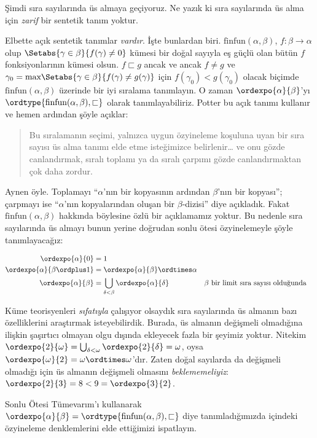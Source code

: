 


Şimdi sıra sayılarında üs almaya geçiyoruz. Ne yazık ki sıra sayılarında üs
alma için \emph{zarif} bir sentetik tanım yoktur.

Elbette açık sentetik tanımlar \emph{vardır}. İşte bunlardan biri.
$\text{finfun}(\alpha,\beta)$, $f\colon\beta\to\alpha$ olup
$\Setabs{\gamma\in\beta}{f(\gamma)\neq 0}$ kümesi bir doğal sayıyla eş
güçlü olan bütün $f$ fonksiyonlarının kümesi olsun. $f\sqsubset g$ ancak ve
ancak $f\neq g$ ve
$\gamma_0=\text{max}\Setabs{\gamma\in\beta}{f(\gamma)\neq g(\gamma)}$
için $f(\gamma_0)<g(\gamma_0)$ olacak biçimde
$\text{finfun}(\alpha,\beta)$ üzerinde bir iyi sıralama tanımlayın. O zaman
$\ordexpo{\alpha}{\beta}$'yı
$\ordtype{\text{finfun}(\alpha,\beta),\sqsubset}$ olarak tanımlayabiliriz.
Potter bu açık tanımı kullanır ve hemen ardından şöyle açıklar:
\begin{quote}
	Bu sıralamanın seçimi, yalnızca uygun özyineleme koşuluna uyan bir sıra
	sayısı üs alma tanımı elde etme isteğimizce belirlenir\ldots{} ve onu
	gözde canlandırmak, sıralı toplamı ya da sıralı çarpımı
	gözde canlandırmaktan çok daha zordur.
	\citep[p.~199]{Potter2004}
\end{quote}
Aynen öyle. Toplamayı ``$\alpha$'nın bir kopyasının ardından $\beta$'nın
bir kopyası''; çarpmayı ise ``$\alpha$'nın kopyalarından oluşan bir
$\beta$-dizisi'' diye açıkladık. Fakat
$\text{finfun}(\alpha,\beta)$ hakkında böylesine özlü bir açıklamamız
yoktur. Bu nedenle sıra sayılarında üs almayı bunun yerine doğrudan
sonlu ötesi özyinelemeyle şöyle tanımlayacağız:

\begin{defn}
\begin{align*}
	\ordexpo{\alpha}{0} &= 1\\
	\ordexpo{\alpha}{\beta\ordplus 1} &=\ordexpo{\alpha}{\beta} \ordtimes \alpha\\
	\ordexpo{\alpha}{\beta} &= \bigcup_{\delta < \beta}\ordexpo{\alpha}{\delta}& & \text{$\beta$ bir limit sıra sayısı olduğunda}
\end{align*}
\end{defn}

Küme teorisyenleri \emph{sıfatıyla} çalışıyor olsaydık sıra sayılarında üs
almanın bazı özelliklerini araştırmak isteyebilirdik. Burada, üs almanın
değişmeli olmadığına ilişkin şaşırtıcı olmayan olgu dışında ekleyecek fazla
bir şeyimiz yoktur. Nitekim
$\ordexpo{2}{\omega}=\bigcup_{\delta<\omega}\ordexpo{2}{\delta}=\omega$,
oysa $\ordexpo{\omega}{2}=\omega\ordtimes\omega$'dır. Zaten doğal sayılarda
da değişmeli olmadığı için üs almanın değişmeli olmasını
\emph{beklememeliyiz}: $\ordexpo{2}{3}=8<9=\ordexpo{3}{2}$.

\begin{prob}
Sonlu Ötesi Tümevarım'ı kullanarak
$\ordexpo{\alpha}{\beta}=\ordtype{\text{finfun}(\alpha,\beta),\sqsubset}$
diye tanımladığımızda
 içindeki özyineleme
denklemlerini elde ettiğimizi ispatlayın.
\end{prob}

